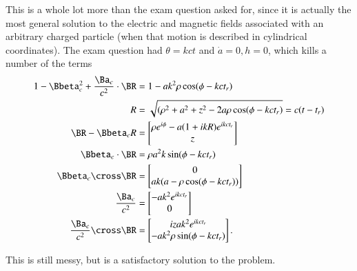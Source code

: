 {This is a whole lot more than the exam question asked for, since it is actually the most general solution to the electric and magnetic fields associated with an arbitrary charged particle (when that motion is described in cylindrical coordinates).  The exam question had \(\theta = k c t\) and \(\dot{a} = 0, h = 0\), which kills a number of the terms
%
\begin{equation}\label{eqn:relativisticElectrodynamicsExamReflection:1010}
\begin{aligned}
1 - \Bbeta_c^2 + \frac{\Ba_c}{c^2} \cdot \BR &= 1 - a k^2 \rho \cos(\phi -  k c t_r) \\
R &= \sqrt{(\rho^2 + a^2 + z^2 - 2 a \rho \cos(\phi - k c t_r)} = c( t - t_r) \\
\BR - \Bbeta_c R &=
\begin{bmatrix}
\rho e^{i\phi} - a (1 + i k R) e^{i k c t_r} \\
z
\end{bmatrix} \\
\Bbeta_c \cdot \BR &= \rho a^2 k \sin(\phi -  k c t_r) \\
\Bbeta_c \cross \BR
&=
\begin{bmatrix}
0 \\
a k ( a - \rho \cos(\phi -  k c t_r) )
\end{bmatrix} \\
\frac{\Ba_c}{c^2} &=
\begin{bmatrix}
- a k^2 e^{i k c t_r} \\
0
\end{bmatrix} \\
\frac{\Ba_c}{c^2} \cross \BR
&=
\begin{bmatrix}
i z a k^2 e^{i k c t_r} \\
- a k^2 \rho \sin(\phi -  k c t_r)
\end{bmatrix}.
\end{aligned}
\end{equation}

This is still messy, but is a satisfactory solution to the problem.

}
